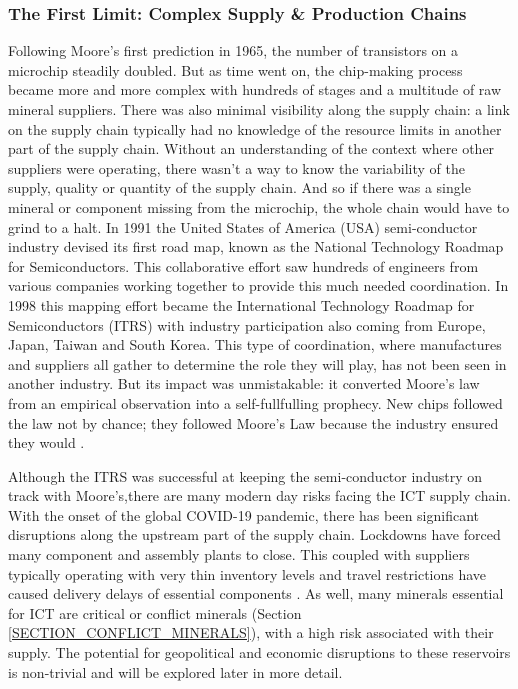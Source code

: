 \documentclass{article}
\begin{document}
\subsubsection{The First Limit: Complex Supply \& Production Chains}
Following Moore's first prediction in 1965, the number of transistors on a microchip steadily doubled. But as time went on, the chip-making process became more and more complex with hundreds of stages and a multitude of raw mineral suppliers. 
There was also minimal visibility along the supply chain: a link on the supply chain typically had no knowledge of the resource limits in another part of the supply chain. Without an understanding of the context where other suppliers were operating, there wasn't a way to know the variability of the supply, quality or quantity of the supply chain. And so if there was a single mineral or component missing from the microchip, the whole chain would have to grind to a halt. In 1991 the United States of America (USA) semi-conductor industry devised its first road map, known as the National Technology Roadmap for Semiconductors. This collaborative effort saw hundreds of engineers from various companies working together to provide this much needed coordination. In 1998 this mapping effort became the International Technology Roadmap for Semiconductors (ITRS) with industry participation also coming from Europe, Japan, Taiwan and South Korea. This type of coordination, where manufactures and suppliers all gather to determine the role they will play, has not been seen in another industry. But its impact was unmistakable: it converted Moore's law from an empirical observation into a self-fullfulling prophecy. New chips followed the law not by chance; they followed Moore's Law because the industry ensured they would \cite{waldrop2016chips, schaller1997moore}.

Although the ITRS was successful at keeping the semi-conductor industry on track with Moore's,there are many modern day risks facing the ICT supply chain. With the onset of the global COVID-19 pandemic, there has been significant disruptions along the upstream part of the supply chain. Lockdowns have forced many component and assembly plants to close. This coupled with suppliers typically operating with very thin inventory levels and travel restrictions have caused delivery delays of essential components \cite{flaviano2021global}. As well, many minerals essential for ICT are critical or conflict minerals (Section \ref{SECTION_CONFLICT_MINERALS}), with a high risk associated with their supply. The potential for geopolitical and economic disruptions to these reservoirs is non-trivial and will be explored later in more detail.
\end{document}
